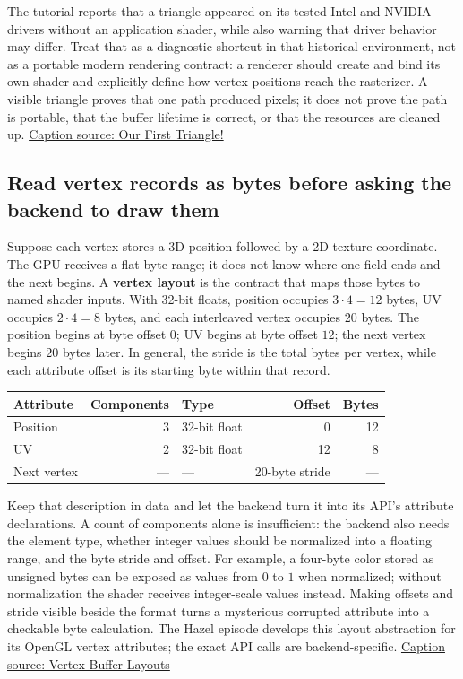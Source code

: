 The tutorial reports that a triangle appeared on its tested Intel and NVIDIA drivers without an application shader, while also warning that driver behavior may differ. Treat that as a diagnostic shortcut in that historical environment, not as a portable modern rendering contract: a renderer should create and bind its own shader and explicitly define how vertex positions reach the rasterizer. A visible triangle proves that one path produced pixels; it does not prove the path is portable, that the buffer lifetime is correct, or that the resources are cleaned up. \href{https://www.youtube.com/watch?v=bwFYXo0VgCc}{Caption source: Our First Triangle!}

\subsection{Read vertex records as bytes before asking the backend to draw them}\label{06-engine-ii-ch025-read-vertex-records-as-bytes-before-asking-the-backend-to-draw-them}

\hypertarget{06-engine-ii-ch025-read-vertex-records-as-bytes-before-asking-the-backend-to-draw-them}{}

Suppose each vertex stores a 3D position followed by a 2D texture coordinate. The GPU receives a flat byte range; it does not know where one field ends and the next begins. A \textbf{vertex layout} is the contract that maps those bytes to named shader inputs. With 32-bit floats, position occupies \(3\cdot4=12\) bytes, UV occupies \(2\cdot4=8\) bytes, and each interleaved vertex occupies \(20\) bytes. The position begins at byte offset \(0\); UV begins at byte offset \(12\); the next vertex begins \(20\) bytes later. In general, the stride is the total bytes per vertex, while each attribute offset is its starting byte within that record.

{\def\LTcaptype{none} %
\begin{longtable}[]{@{}lrlrr@{}}
\toprule\noalign{}
Attribute & Components & Type & Offset & Bytes \\
\midrule\noalign{}
\endhead
\bottomrule\noalign{}
\endlastfoot
Position & 3 & 32-bit float & 0 & 12 \\
UV & 2 & 32-bit float & 12 & 8 \\
Next vertex & --- & --- & 20-byte stride & --- \\
\end{longtable}
}

Keep that description in data and let the backend turn it into its API's attribute declarations. A count of components alone is insufficient: the backend also needs the element type, whether integer values should be normalized into a floating range, and the byte stride and offset. For example, a four-byte color stored as unsigned bytes can be exposed as values from \(0\) to \(1\) when normalized; without normalization the shader receives integer-scale values instead. Making offsets and stride visible beside the format turns a mysterious corrupted attribute into a checkable byte calculation. The Hazel episode develops this layout abstraction for its OpenGL vertex attributes; the exact API calls are backend-specific. \href{https://www.youtube.com/watch?v=jIJFM_pi6gQ}{Caption source: Vertex Buffer Layouts}

